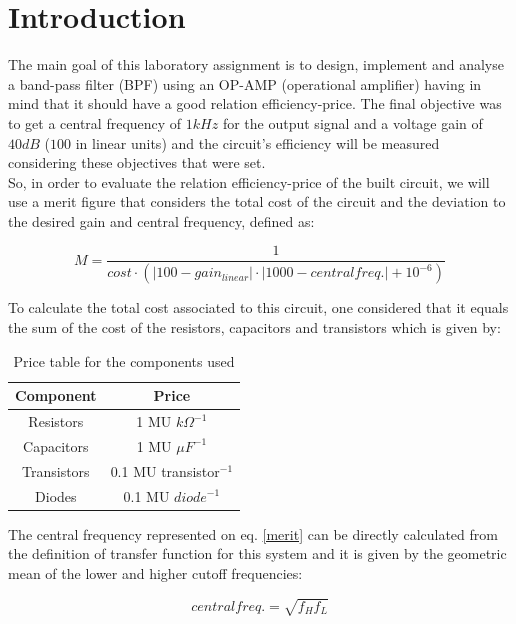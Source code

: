\section{Introduction}
The main goal of this laboratory assignment is to design, implement and analyse a band-pass filter (BPF) using an OP-AMP (operational amplifier) having in mind that it should have a good relation efficiency-price. The final objective was to get a central frequency of $1kHz$ for the output signal and a voltage gain of $40dB$ ($100$ in linear units) and the circuit's efficiency will be measured considering these objectives that were set. \\

So, in order to evaluate the relation efficiency-price of the built circuit, we will use a merit figure that considers the total cost of the circuit and the deviation to the desired gain and central frequency, defined as:

\begin{equation}
    M = \frac{1}{cost \cdot (|100 - gain_{linear}| \cdot |1000 - central freq.| + 10^{-6})}
    \label{merit}
\end{equation}

To calculate the total cost associated to this circuit, one considered that it equals the sum of the cost of the resistors, capacitors and transistors which is given by:

\begin{table}[H]
    \centering
    \begin{tabular}{|c|c|}
        \hline
        \textbf{Component} &  \textbf{Price}\\
        \hline
        Resistors & 1 MU $k\Omega^{-1}$ \\ \hline
        Capacitors & 1 MU $\mu F^{-1}$ \\ \hline
        Transistors & 0.1 MU transistor$^{-1}$\\
        \hline
        Diodes & 0.1 MU $diode^{-1}$\\ \hline
    \end{tabular}
    \caption{Price table for the components used}
    \label{tab:price}
\end{table}

The central frequency represented on eq. \eqref{merit} can be directly calculated from the definition of transfer function for this system and it is given by the geometric mean of the lower and higher cutoff frequencies:

\begin{equation}
    central freq. = \sqrt{f_H f_L}
\end{equation}

